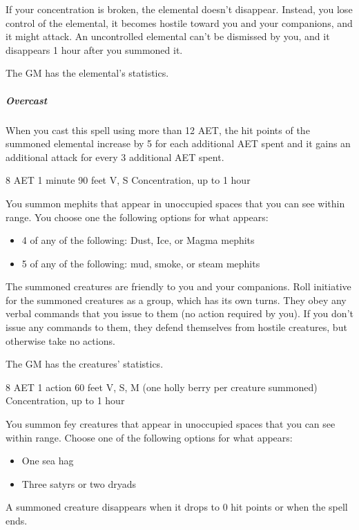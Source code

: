 If your concentration is broken, the elemental doesn't disappear. Instead, you lose control of the elemental, it becomes hostile toward you and your companions, and it might attack. An uncontrolled elemental can't be dismissed by you, and it disappears 1 hour after you summoned it.

The GM has the elemental's statistics.

\subparagraph*{Overcast} When you cast this spell using more than 12 AET, the hit points of the summoned elemental increase by 5 for each additional AET spent and it gains an additional attack for every 3 additional AET spent.


{8 AET}
{1 minute}
{90 feet}
{V, S}
{Concentration, up to 1 hour}

You summon mephits that appear in unoccupied spaces that you can see within range. You choose one the following options for what appears:
\begin{itemize}
\item 4 of any of the following: Dust, Ice, or Magma mephits
\item 5 of any of the following: mud, smoke, or steam mephits
\end{itemize}

The summoned creatures are friendly to you and your companions. Roll initiative for the summoned creatures as a group, which has its own turns. They obey any verbal commands that you issue to them (no action required by you). If you don't issue any commands to them, they defend themselves from hostile creatures, but otherwise take no actions.

The GM has the creatures' statistics.


{8 AET}
{1 action}
{60 feet}
{V, S, M (one holly berry per creature summoned)}
{Concentration, up to 1 hour}

You summon fey creatures that appear in unoccupied spaces that you can see within range. Choose one of the following options for what appears:

\begin{itemize}
\item One sea hag
\item Three satyrs or two dryads
\end{itemize}

A summoned creature disappears when it drops to 0 hit points or when the spell ends.

